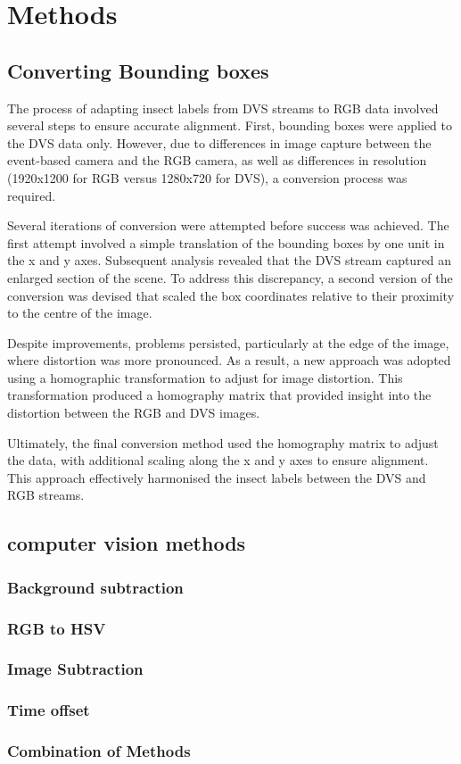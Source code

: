 \chapter{Methods}
\label{ch:methods}


\section{Converting Bounding boxes}

The process of adapting insect labels from DVS streams to RGB data involved several steps to ensure accurate alignment. First, bounding boxes were applied to the DVS data only. However, due to differences in image capture between the event-based camera and the RGB camera, as well as differences in resolution (1920x1200 for RGB versus 1280x720 for DVS), a conversion process was required.

Several iterations of conversion were attempted before success was achieved. The first attempt involved a simple translation of the bounding boxes by one unit in the x and y axes. Subsequent analysis revealed that the DVS stream captured an enlarged section of the scene. To address this discrepancy, a second version of the conversion was devised that scaled the box coordinates relative to their proximity to the centre of the image.

Despite improvements, problems persisted, particularly at the edge of the image, where distortion was more pronounced. As a result, a new approach was adopted using a homographic transformation to adjust for image distortion. This transformation produced a homography matrix that provided insight into the distortion between the RGB and DVS images.

Ultimately, the final conversion method used the homography matrix to adjust the data, with additional scaling along the x and y axes to ensure alignment. This approach effectively harmonised the insect labels between the DVS and RGB streams.


\section{computer vision methods}

\subsection{Background subtraction}

\subsection{RGB to HSV}

\subsection{Image Subtraction}

\subsection{Time offset}

\subsection{Combination of Methods}
